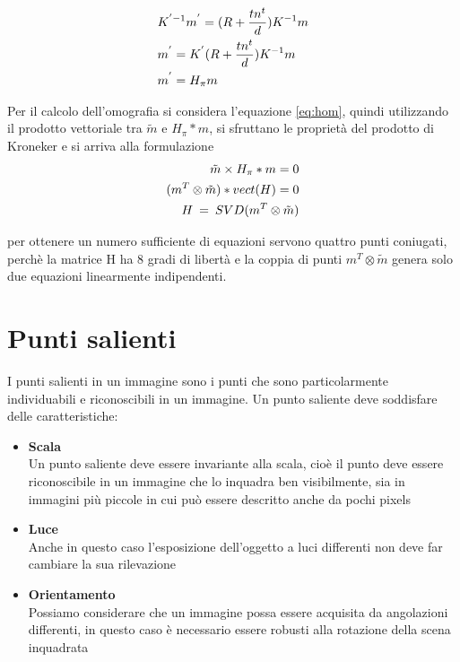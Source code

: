 \documentclass[11pt, oneside]{article}   	%
\begin{document}
\begin{eqnarray}
	& K^{'  -1} m^{'} = (R+ \frac{tn^{t}}{d}) K^{-1}m \notag \\
	& m^{'} = K^{'}(R+ \frac{tn^{t}}{d}) K^{-1}m \notag \\
	& m^{'} = H_{\pi}m 
	\label{eq:hom}
\end{eqnarray}



Per il calcolo dell'omografia si considera l'equazione \ref{eq:hom}, quindi utilizzando il prodotto vettoriale tra $\tilde{m}$ e $H_{\pi}*m$,  si sfruttano le proprietà del prodotto di Kroneker  e si arriva alla formulazione 
\begin{align}
	\tilde{m} \times H_{\pi}*m = 0 \notag \\
	(m^{T} \otimes \tilde{m})*vect(H) = 0 \notag \\
	H \: = \: SVD(m^{T} \otimes \tilde{m})
\end{align}

per ottenere un numero sufficiente di equazioni servono quattro punti coniugati, perchè la matrice H ha 8 gradi di libertà e la coppia di punti $m^{T} \otimes \tilde{m}$ genera solo due equazioni linearmente indipendenti.














\section{Punti salienti}
I punti salienti in un immagine sono i punti che sono particolarmente individuabili e riconoscibili in un immagine.
Un punto saliente deve soddisfare delle caratteristiche:

\begin{itemize}
	\item \textbf{Scala} \\
	Un punto saliente deve essere invariante alla scala, cioè il punto deve essere riconoscibile in un immagine che lo
	inquadra ben visibilmente, sia in immagini più piccole in cui può essere descritto anche da pochi pixels
	\item \textbf{Luce} \\
	Anche in questo caso l'esposizione dell'oggetto a luci differenti non deve far cambiare la sua rilevazione
	\item \textbf{Orientamento} \\
	Possiamo considerare che un immagine possa essere acquisita da angolazioni differenti, in questo caso è
	necessario essere robusti alla rotazione della scena inquadrata


\end{itemize}
\end{document}
